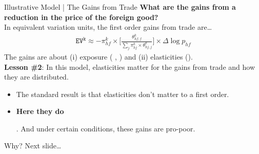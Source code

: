 \documentclass[9pt,pdftex,aspectratio=1610]{beamer}
\theoremstyle{definition}
\begin{document}
\begin{frame}[t]{Illustrative Model | The Gains from Trade}
\smallskip
\textbf{What are the gains from a reduction in the price of the foreign good?}\\
\bigskip
In equivalent variation units, the first order gains from trade are\ldots
\begin{align*}
\mathtt{EV^k} \approx -\pi_{hf}^k \times \bigg [ \frac{ \theta_{hf,f}^k }{ \sum\limits_{j} \pi_{hj}^k \times \theta_{hj,j}^k}  \bigg] \times \Delta\log{p}_{hf}
\end{align*}
The gains are about (i) exposure ( {\small \citet{deaton1989rice}, \citet{borusyak2021distributional} }) and (ii) elasticities ({\small \citet*{auer2022unequal}}).\\
\bigskip
\textbf{Lesson \#2}: In this model, elasticities matter for the gains from trade and how they are distributed.
\begin{itemize}
\smallskip
\item The standard result is that elasticities don't matter to a first order.
\smallskip
\item \begin{alert}{\textbf{Here they do}}\end{alert}. And under certain conditions, these gains are pro-poor.
\end{itemize}
\medskip
Why? Next slide\ldots
\end{frame}
\end{document}
